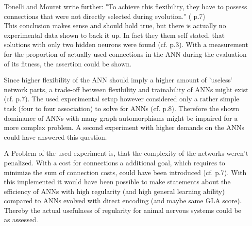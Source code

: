 \documentclass[12pt,twoside]{article}
\theoremstyle{plain}
\theoremstyle{definition}
\theoremstyle{remark}
\begin{document}
Tonelli and Mouret write further: "To achieve this flexibility, they have to possess
connections that were not directly selected during evolution." (\cite{citeulike:12788284} p.7)\\
This conclusion makes sense and should hold true, but there is actually no experimental data shown to back it up. In fact they them self stated, that solutions with only two hidden neurons were found (cf. \cite{citeulike:12788284} p.3).
With a measurement for the proportion of actually used connections in the ANN during the evaluation of its fitness, the assertion could be shown.\medskip

Since higher flexibility of the ANN should imply a higher amount of 'useless' network parts, a trade-off between flexibility and trainability of ANNs might exist (cf. \cite{citeulike:12788284} p.7).
The used experimental setup however considered only a rather simple task (four to four association) to solve for ANNs (cf. \cite{citeulike:12788284} p.8).
Therefore the  shown dominance of ANNs with many graph automorphisms might be impaired for a more complex problem. A second experiment with higher demands on the ANNs could have answered this question.\medskip
 
A Problem of the used experiment is, that the complexity of the networks weren't penalized. With a cost for connections a additional goal, which requires to minimize the sum of connection costs, could have been introduced (cf. \cite{citeulike:12788284} p.7).
With this implemented it would have been possible to make statements about the efficiency of ANNs with high regularity (and high general learning ability) compared to ANNs evolved with direct encoding (and maybe same GLA score).
Thereby the actual usefulness of regularity for animal nervous systems could be as assessed.


\end{document}
